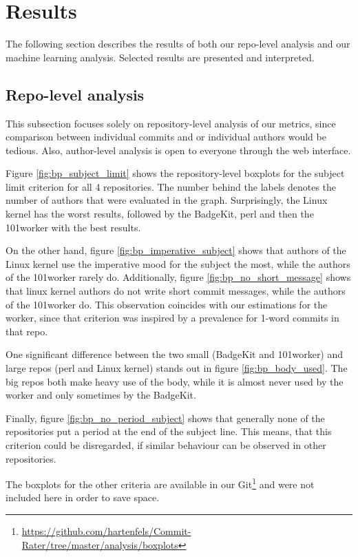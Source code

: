 \section{Results}
\label{sec:results}

The following section describes the results of both our repo-level analysis and our machine learning analysis. Selected results are presented and interpreted.


\subsection{Repo-level analysis}
\label{sec:results1}

This subsection focuses solely on repository-level analysis of our metrics, since comparison between individual commits and or individual authors would be tedious. Also, author-level analysis is open to everyone through the web interface.

Figure \ref{fig:bp_subject_limit} shows the repository-level boxplots for the subject limit criterion for all 4 repositories. The number behind the labels denotes the number of authors that were evaluated in the graph. Surprisingly, the Linux kernel has the worst results, followed by the BadgeKit, perl and then the 101worker with the best results.

On the other hand, figure \ref{fig:bp_imperative_subject} shows that authors of the Linux kernel use the imperative mood for the subject the most, while the authors of the 101worker rarely do. Additionally, figure \ref{fig:bp_no_short_message} shows that linux kernel authors do not write short commit messages, while the authors of the 101worker do. This observation coincides with our estimations for the worker, since that criterion was inspired by a prevalence for 1-word commits in that repo.

One significant difference between the two small (BadgeKit and 101worker) and large repos (perl and Linux kernel) stands out in figure \ref{fig:bp_body_used}. The big repos both make heavy use of the body, while it is almost never used by the worker and only sometimes by the BadgeKit.

Finally, figure \ref{fig:bp_no_period_subject} shows that generally none of the repositories put a period at the end of the subject line. This means, that this criterion could be disregarded, if similar behaviour can be observed in other repositories.

The boxplots for the other criteria are available in our Git\footnote{\url{https://github.com/hartenfels/Commit-Rater/tree/master/analysis/boxplots}} and were not included here in order to save space.

